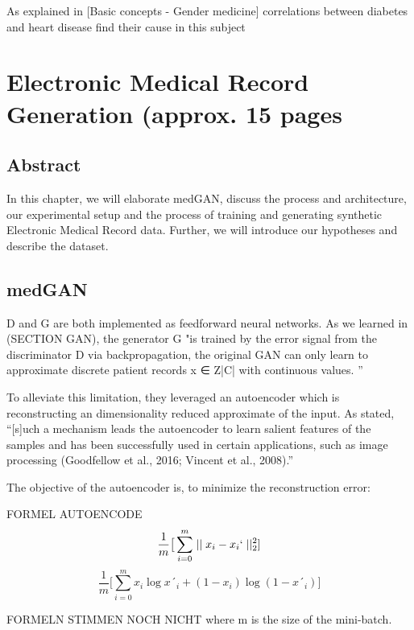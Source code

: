 \documentclass[11pt, a4paper]{book}
\begin{document}
As explained in [Basic concepts - Gender medicine] correlations between diabetes and heart disease find their cause in this subject

\chapter{Electronic Medical Record Generation (approx. 15 pages}
\section{Abstract}
In this chapter, we will elaborate medGAN, discuss the process and architecture, our experimental setup and the process of training and generating synthetic Electronic Medical Record data. Further, we will introduce our hypotheses and describe the dataset.
\section{medGAN}
D and G are both implemented as feedforward neural networks.
As we learned in (SECTION GAN), the generator G "is trained by the error signal from the discriminator D via backpropagation, the original GAN can only learn to approximate discrete patient records x ∈ Z|C| with continuous values. ” \citep{Choi2017}

To alleviate this limitation, they leveraged an autoencoder which is reconstructing an dimensionality reduced approximate of the input. As \citep{Choi2017} stated, “[s]uch a mechanism leads the autoencoder to learn salient features of the samples and has been successfully used in certain applications, such as image processing (Goodfellow et al., 2016; Vincent et al., 2008).” 

The objective of the autoencoder is, to minimize the reconstruction error:

FORMEL AUTOENCODE
\begin{equation}
\frac{1}{m}\big[\sum_{i=0}^m \mid\mid x_i - x_i`\mid\mid_2^2]
\end{equation}
\begin{equation}
\frac{1}{m}\big[\sum_{i=0}^m x_i \log x´_i + (1-x_i) \log (1-x´_i)]
\end{equation}

FORMELN STIMMEN NOCH NICHT
where m is the size of the mini-batch.
\end{document}
